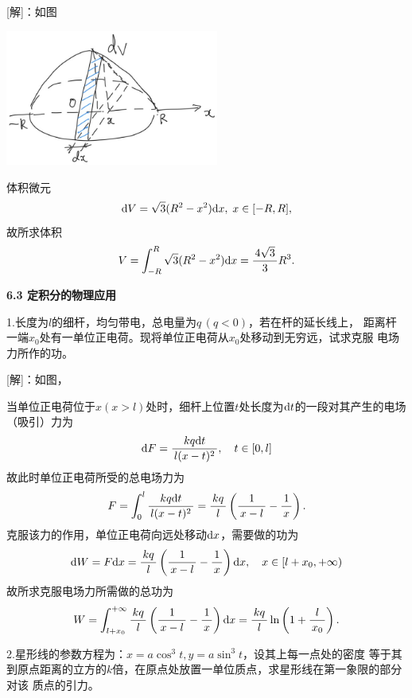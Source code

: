[解]：如图
\begin{center}
	\includegraphics[width=7cm]{./images/ch6/rtSp.jpg}
\end{center}
体积微元
$$\d V=\sqrt3(R^2-x^2)\d x,\;x\in[-R,R],$$
故所求体积
$$V=\dint_{-R}^R\sqrt3(R^2-x^2)\d x=\df{4\sqrt3}3R^3.$$
\fin

\bs

{\bf 6.3 定积分的物理应用}

\bs

1.长度为$l$的细杆，均匀带电，总电量为$q\,(q<0)$，若在杆的延长线上，
距离杆一端$x_0$处有一单位正电荷。现将单位正电荷从$x_0$处移动到无穷远，试求克服
电场力所作的功。

[解]：如图，
\begin{center}
\end{center}
当单位正电荷位于$x(x>l)$处时，细杆上位置$t$处长度为$\d t$的一段对其产生的电场（吸引）力为
$$\d F=\df{kq\d t}{l(x-t)^2},\quad t\in[0,l]$$
故此时单位正电荷所受的总电场力为
$$F=\dint_0^l\df{kq\d t}{l(x-t)^2}=\df{kq}l\left(\df1{x-l}-\df1x\right).$$
克服该力的作用，单位正电荷向远处移动$\d x$，需要做的功为
$$\d W=F\d x=\df{kq}l\left(\df1{x-l}-\df1x\right)\d x,
\quad x\in[l+x_0,+\infty)$$
故所求克服电场力所需做的总功为
$$W=\dint_{l+x_0}^{+\infty}\df{kq}l\left(\df1{x-l}-\df1x\right)\d x
=\df{kq}l\ln\left(1+\df{l}{x_0}\right).$$
\fin

\bs

2.星形线的参数方程为：$x=a\cos^3t,y=a\sin^3t$，设其上每一点处的密度
等于其到原点距离的立方的$k$倍，在原点处放置一单位质点，求星形线在第一象限的部分对该
质点的引力。


